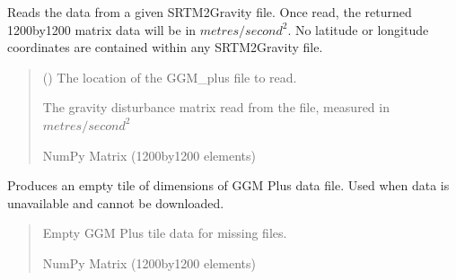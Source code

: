 \documentclass[letterpaper,10pt,english]{sphinxmanual}
\begin{document}

\begin{fulllineitems}
\label{\detokenize{modules/gravity/srtm2gravity:qnav.gravity.srtm2gravity.read_srtm_file}}
\pysigstartsignatures
{}
\pysigstopsignatures
\sphinxAtStartPar
Reads the data from a given SRTM2Gravity file. Once read, the returned
1200\sphinxhyphen{}by\sphinxhyphen{}1200 matrix data will be in \(metres/second^2\). No latitude
or longitude coordinates are contained within any SRTM2Gravity file.
\begin{quote}\begin{description}
\sphinxAtStartPar
{} () \textendash{} The location of the GGM\_plus file to read.

\sphinxAtStartPar
The gravity disturbance matrix read from the file,
measured in \(metres/second^2\)

\sphinxAtStartPar
NumPy Matrix (1200\sphinxhyphen{}by\sphinxhyphen{}1200 elements)

\end{description}\end{quote}

\end{fulllineitems}


\begin{fulllineitems}
\label{\detokenize{modules/gravity/srtm2gravity:qnav.gravity.srtm2gravity.get_empty_srtm_tile}}
\pysigstartsignatures
{}
\pysigstopsignatures
\sphinxAtStartPar
Produces an empty tile of dimensions of GGM Plus data file.
Used when data is unavailable and cannot be downloaded.
\begin{quote}\begin{description}
\sphinxAtStartPar
Empty GGM Plus tile data for missing files.

\sphinxAtStartPar
NumPy Matrix (1200\sphinxhyphen{}by\sphinxhyphen{}1200 elements)

\end{description}\end{quote}

\end{fulllineitems}
\end{document}
